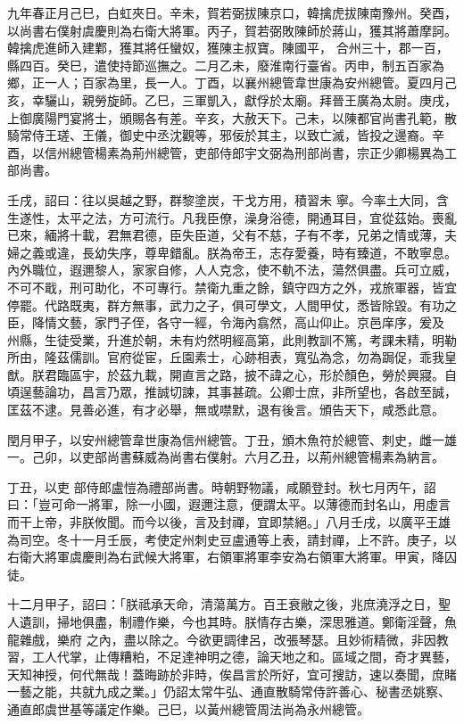 \begin{pinyinscope}
 九年春正月己巳，白虹夾日。辛未，賀若弼拔陳京口，韓擒虎拔陳南豫州。癸酉，以尚書右僕射虞慶則為右衛大將軍。丙子，賀若弼敗陳師於蔣山，獲其將蕭摩訶。韓擒虎進師入建鄴，獲其將任蠻奴，獲陳主叔寶。陳國平，
 合州三十，郡一百，縣四百。癸巳，遣使持節巡撫之。二月乙未，廢淮南行臺省。丙申，制五百家為鄉，正一人；百家為里，長一人。丁酉，以襄州總管韋世康為安州總管。夏四月己亥，幸驪山，親勞旋師。乙巳，三軍凱入，獻俘於太廟。拜晉王廣為太尉。庚戌，上御廣陽門宴將士，頒賜各有差。辛亥，大赦天下。己未，以陳都官尚書孔範，散騎常侍王瑳、王儀，御史中丞沈觀等，邪佞於其主，以致亡滅，皆投之邊裔。辛酉，以信州總管楊素為荊州總管，吏部侍郎宇文弼為刑部尚書，宗正少卿楊異為工部尚書。



 壬戌，詔曰：往以吳越之野，群黎塗炭，干戈方用，積習未
 寧。今率土大同，含生遂性，太平之法，方可流行。凡我臣僚，澡身浴德，開通耳目，宜從茲始。喪亂已來，緬將十載，君無君德，臣失臣道，父有不慈，子有不孝，兄弟之情或薄，夫婦之義或違，長幼失序，尊卑錯亂。朕為帝王，志存愛養，時有臻道，不敢寧息。內外職位，遐邇黎人，家家自修，人人克念，使不軌不法，蕩然俱盡。兵可立威，不可不戢，刑可助化，不可專行。禁衛九重之餘，鎮守四方之外，戎旅軍器，皆宜停罷。代路既夷，群方無事，武力之子，俱可學文，人間甲仗，悉皆除毀。有功之臣，降情文藝，家門子侄，各守一經，令海內翕然，高山仰止。京邑庠序，爰及
 州縣，生徒受業，升進於朝，未有灼然明經高第，此則教訓不篤，考課未精，明勒所由，隆茲儒訓。官府從宦，丘園素士，心跡相表，寬弘為念，勿為跼促，乖我皇猷。朕君臨區宇，於茲九載，開直言之路，披不諱之心，形於顏色，勞於興寢。自頃逞藝論功，昌言乃眾，推誠切諫，其事甚疏。公卿士庶，非所望也，各啟至誠，匡茲不逮。見善必進，有才必舉，無或噤默，退有後言。頒告天下，咸悉此意。



 閏月甲子，以安州總管韋世康為信州總管。丁丑，頒木魚符於總管、刺史，雌一雄一。己卯，以吏部尚書蘇威為尚書右僕射。六月乙丑，以荊州總管楊素為納言。



 丁丑，以吏
 部侍郎盧愷為禮部尚書。時朝野物議，咸願登封。秋七月丙午，詔曰：「豈可命一將軍，除一小國，遐邇注意，便謂太平。以薄德而封名山，用虛言而干上帝，非朕攸聞。而今以後，言及封禪，宜即禁絕。」八月壬戌，以廣平王雄為司空。冬十一月壬辰，考使定州刺史豆盧通等上表，請封禪，上不許。庚子，以右衛大將軍虞慶則為右武候大將軍，右領軍將軍李安為右領軍大將軍。甲寅，降囚徒。



 十二月甲子，詔曰：「朕祗承天命，清蕩萬方。百王衰敝之後，兆庶澆浮之日，聖人遺訓，掃地俱盡，制禮作樂，今也其時。朕情存古樂，深思雅道。鄭衛淫聲，魚龍雜戲，樂府
 之內，盡以除之。今欲更調律呂，改張琴瑟。且妙術精微，非因教習，工人代掌，止傳糟粕，不足達神明之德，論天地之和。區域之間，奇才異藝，天知神授，何代無哉！蓋晦跡於非時，俟昌言於所好，宜可搜訪，速以奏聞，庶睹一藝之能，共就九成之業。」仍詔太常牛弘、通直散騎常侍許善心、秘書丞姚察、通直郎虞世基等議定作樂。己巳，以黃州總管周法尚為永州總管。




\end{pinyinscope}
